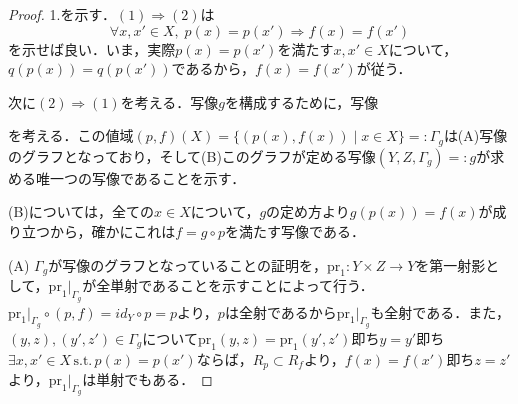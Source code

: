 \documentclass[uplatex,dvipdfmx]{jsreport}
\begin{document}
\begin{proof}
    1.を示す．$(1)\Rightarrow (2)$は\[ \forall x,x'\in X ,\; p(x)=p(x')\Rightarrow f(x)=f(x') \]を示せば良い．いま，実際$p(x)=p(x')$を満たす$x,x'\in X$について，$q(p(x))=q(p(x'))$であるから，$f(x)=f(x')$が従う．

    次に$(2)\Rightarrow (1)$を考える．写像$g$を構成するために，写像
    \begin{center}\end{center}
    を考える．この値域$(p,f)(X)=\{ (p(x),f(x))\mid x\in X \}=:\Gamma_g$は(A)写像のグラフとなっており，そして(B)このグラフが定める写像$(Y,Z,\Gamma_g)=:g$が求める唯一つの写像であることを示す．

    (B)については，全ての$x\in X$について，$g$の定め方より$g(p(x))=f(x)$が成り立つから，確かにこれは$f=g\circ p$を満たす写像である．

    (A) $\Gamma_g$が写像のグラフとなっていることの証明を，$\mathrm{pr}_1:Y\times Z\to Y$を第一射影として，$\mathrm{pr}_1|_{\Gamma_g}$が全単射であることを示すことによって行う．
    $\mathrm{pr}_1|_{\Gamma_g}\circ (p,f)=id_Y\circ p=p$より，$p$は全射であるから$\mathrm{pr}_1|_{\Gamma_g}$も全射である．また，$(y,z),(y',z')\in\Gamma_g$について$\mathrm{pr}_1(y,z)=\mathrm{pr}_1(y',z')$即ち$y=y'$即ち
    $\exists x,x'\in X \,\mathrm{s.t.}\, p(x)=p(x')$ならば，$R_p\subset R_f$より，$f(x)=f(x')$即ち$z=z'$より，$\mathrm{pr}_1|_{\Gamma_g}$は単射でもある．
\end{proof}
\end{document}
